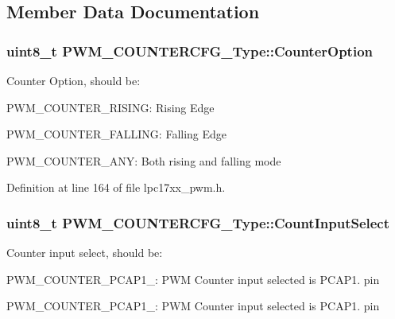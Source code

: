 \subsection{\-Member \-Data \-Documentation}
\hypertarget{struct_p_w_m___c_o_u_n_t_e_r_c_f_g___type_af9f95c59d3e6b17ac7df5b046c4414b8}{
\subsubsection[{\-Counter\-Option}]{\setlength{\rightskip}{0pt plus 5cm}uint8\-\_\-t {\bf \-P\-W\-M\-\_\-\-C\-O\-U\-N\-T\-E\-R\-C\-F\-G\-\_\-\-Type\-::\-Counter\-Option}}}\label{struct_p_w_m___c_o_u_n_t_e_r_c_f_g___type_af9f95c59d3e6b17ac7df5b046c4414b8}
\-Counter \-Option, should be\-:
\begin{DoxyItemize}
\item \-P\-W\-M\-\_\-\-C\-O\-U\-N\-T\-E\-R\-\_\-\-R\-I\-S\-I\-N\-G\-: \-Rising \-Edge
\item \-P\-W\-M\-\_\-\-C\-O\-U\-N\-T\-E\-R\-\_\-\-F\-A\-L\-L\-I\-N\-G\-: \-Falling \-Edge
\item \-P\-W\-M\-\_\-\-C\-O\-U\-N\-T\-E\-R\-\_\-\-A\-N\-Y\-: \-Both rising and falling mode 
\end{DoxyItemize}

\-Definition at line 164 of file lpc17xx\-\_\-pwm.\-h.

\hypertarget{struct_p_w_m___c_o_u_n_t_e_r_c_f_g___type_aed8184648a18ab535b3662d431030bc9}{
\subsubsection[{\-Count\-Input\-Select}]{\setlength{\rightskip}{0pt plus 5cm}uint8\-\_\-t {\bf \-P\-W\-M\-\_\-\-C\-O\-U\-N\-T\-E\-R\-C\-F\-G\-\_\-\-Type\-::\-Count\-Input\-Select}}}\label{struct_p_w_m___c_o_u_n_t_e_r_c_f_g___type_aed8184648a18ab535b3662d431030bc9}
\-Counter input select, should be\-:
\begin{DoxyItemize}
\item \-P\-W\-M\-\_\-\-C\-O\-U\-N\-T\-E\-R\-\_\-\-P\-C\-A\-P1\-\_\-: \-P\-W\-M \-Counter input selected is \-P\-C\-A\-P1. pin
\item \-P\-W\-M\-\_\-\-C\-O\-U\-N\-T\-E\-R\-\_\-\-P\-C\-A\-P1\-\_\-: \-P\-W\-M \-Counter input selected is \-P\-C\-A\-P1. pin 
\end{DoxyItemize}

